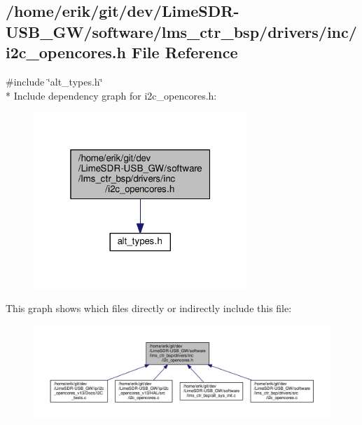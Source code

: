 \subsection{/home/erik/git/dev/\+Lime\+S\+D\+R-\/\+U\+S\+B\+\_\+\+G\+W/software/lms\+\_\+ctr\+\_\+bsp/drivers/inc/i2c\+\_\+opencores.h File Reference}
\label{software_2lms__ctr__bsp_2drivers_2inc_2i2c__opencores_8h}
{\ttfamily \#include \char`\"{}alt\+\_\+types.\+h\char`\"{}}\\*
Include dependency graph for i2c\+\_\+opencores.\+h\+:
\nopagebreak
\begin{figure}[H]
\begin{center}
\leavevmode
\includegraphics[width=229pt]{dc/d8b/software_2lms__ctr__bsp_2drivers_2inc_2i2c__opencores_8h__incl}
\end{center}
\end{figure}
This graph shows which files directly or indirectly include this file\+:
\nopagebreak
\begin{figure}[H]
\begin{center}
\leavevmode
\includegraphics[width=350pt]{dd/de0/software_2lms__ctr__bsp_2drivers_2inc_2i2c__opencores_8h__dep__incl}
\end{center}
\end{figure}
